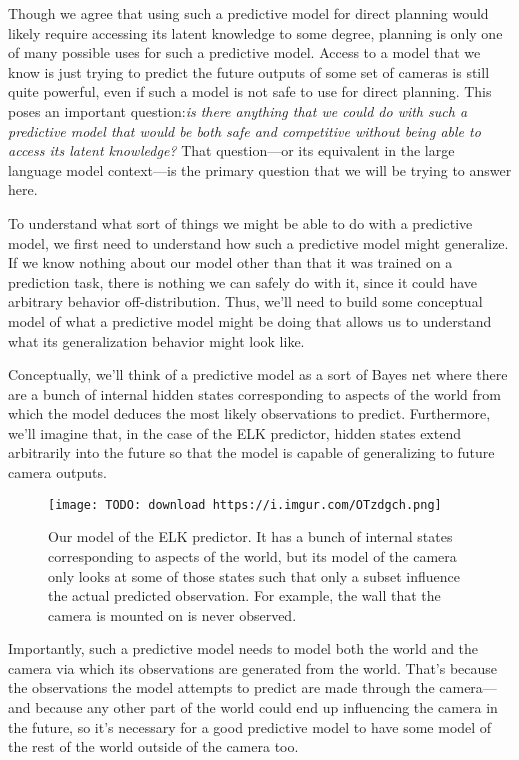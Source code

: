 {Though we agree that using such a predictive model for direct planning would likely require accessing its latent knowledge to some degree, planning is only one of many possible uses for such a predictive model. Access to a model that we know is just trying to predict the future outputs of some set of cameras is still quite powerful, even if such a model is not safe to use for direct planning. This poses an important question:\textit{is there anything that we could do with such a predictive model that would be both safe and competitive without being able to access its latent knowledge?} That question---or its equivalent in the large language model context---is the primary question that we will be trying to answer here.

To understand what sort of things we might be able to do with a predictive model, we first need to understand how such a predictive model might generalize. If we know nothing about our model other than that it was trained on a prediction task, there is nothing we can safely do with it, since it could have arbitrary behavior off-distribution. Thus, we'll need to build some conceptual model of what a predictive model might be doing that allows us to understand what its generalization behavior might look like.

Conceptually, we'll think of a predictive model as a sort of Bayes net\cite{TODO: cite https://en.wikipedia.org/wiki/Bayesian_network} where there are a bunch of internal hidden states corresponding to aspects of the world from which the model deduces the most likely observations to predict. Furthermore, we'll imagine that, in the case of the ELK predictor, hidden states extend arbitrarily into the future so that the model is capable of generalizing to future camera outputs.

\begin{figure}[h!]
  \centering
  \texttt{[image: TODO: download https://i.imgur.com/OTzdgch.png]}
  \caption{Our model of the ELK predictor. It has a bunch of internal states corresponding to aspects of the world, but its model of the camera only looks at some of those states such that only a subset influence the actual predicted observation. For example, the wall that the camera is mounted on is never observed.}
\end{figure}

Importantly, such a predictive model needs to model both the world and the camera via which its observations are generated from the world. That's because the observations the model attempts to predict are made through the camera---and because any other part of the world could end up influencing the camera in the future, so it's necessary for a good predictive model to have some model of the rest of the world outside of the camera too.

}
